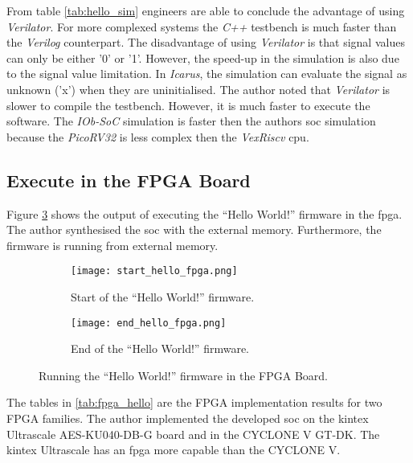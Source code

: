 From table \ref{tab:hello_sim} engineers are able to conclude the advantage of using \textit{Verilator}. For more complexed systems the \textit{C++} testbench is much faster than the \textit{Verilog} counterpart. The disadvantage of using \textit{Verilator} is that signal values can only be either '0' or '1'. However, the speed-up in the simulation is also due to the signal value limitation. In \textit{Icarus}, the simulation can evaluate the signal as unknown ('x') when they are uninitialised. The author noted that \textit{Verilator} is slower to compile the testbench. However, it is much faster to execute the software. The \textit{IOb-SoC} simulation is faster then the authors \acrshort{soc} simulation because the \textit{PicoRV32} is less complex then the \textit{VexRiscv} \acrshort{cpu}.

\subsection{Execute in the FPGA Board}
Figure \ref{fig:hello_fpga} shows the output of executing the \enquote{Hello World!} firmware in the \acrshort{fpga}. The author synthesised the \acrshort{soc} with the external memory. Furthermore, the firmware is running from external memory.

\begin{figure}[!ht]
    \centering
    \begin{subfigure}[b]{0.49\textwidth}
        \centering
        \texttt{[image: start\_hello\_fpga.png]}
        \caption{Start of the \enquote{Hello World!} firmware.}
        \label{fig:start_hello_fpga}
    \end{subfigure}
    \hfill
    \begin{subfigure}[b]{0.49\textwidth}
        \centering
        \texttt{[image: end\_hello\_fpga.png]}
        \caption{End of the \enquote{Hello World!} firmware.}
        \label{fig:end_hello_fpga}
    \end{subfigure}
    \caption{Running the \enquote{Hello World!} firmware in the FPGA Board.}
    \label{fig:hello_fpga}
\end{figure}

The tables in \ref{tab:fpga_hello} are the FPGA implementation results for two FPGA families. The author implemented the developed \acrshort{soc} on the kintex Ultrascale AES-KU040-DB-G board and in the CYCLONE V GT-DK. The kintex Ultrascale has an \acrshort{fpga} more capable than the CYCLONE V.

